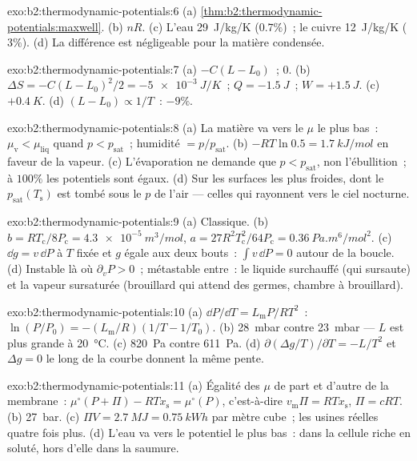 \begin{solution}{exo:b2:thermodynamic-potentials:6}
(a) \cref{thm:b2:thermodynamic-potentials:maxwell}. (b) $nR$. (c) L'eau
\qty{29}{J/kg/K} ($0.7\%$)~; le cuivre \qty{12}{J/kg/K} ($3\%$). (d) La
différence est négligeable pour la matière condensée.
\end{solution}

\begin{solution}{exo:b2:thermodynamic-potentials:7}
(a) $-C(L - L_0)$~; $0$. (b) $\Delta S = -C(L - L_0)^2/2 = \qty{-5e-3}{J/K}$~; $Q =
\qty{-1.5}{J}$~; $W = +\qty{1.5}{J}$. (c) $+\qty{0.4}{K}$. (d) $(L - L_0) \propto
1/T$~: $-9\%$.
\end{solution}

\begin{solution}{exo:b2:thermodynamic-potentials:8}
(a) La matière va vers le $\mu$ le plus bas~: $\mu_{\text{v}} < \mu_{\text{liq}}$ quand $p <
p_{\text{sat}}$~; humidité $= p/p_{\text{sat}}$. (b) $-RT\ln 0.5 = \qty{1.7}{kJ/mol}$
en faveur de la vapeur. (c) L'évaporation ne demande que $p < p_{\text{sat}}$,
non l'ébullition~; à $100\%$ les potentiels sont égaux. (d) Sur les surfaces les plus
froides, dont le $p_{\text{sat}}(T_{\text{s}})$ est tombé sous le $p$ de l'air
--- celles qui rayonnent vers le ciel nocturne.
\end{solution}

\begin{solution}{exo:b2:thermodynamic-potentials:9}
(a) Classique. (b) $b = RT_{\text{c}}/8P_{\text{c}} = \qty{4.3e-5}{m^3/mol}$, $a =
27R^2T_{\text{c}}^2/64P_{\text{c}} = \qty{0.36}{Pa.m^6/mol^2}$. (c) $\dd g = v\,\dd P$
à $T$ fixée et $g$ égale aux deux bouts~: $\int v\,\dd P = 0$ autour de la
boucle. (d) Instable là où $\partial_vP > 0$~; métastable entre~: le
liquide surchauffé (qui sursaute) et la vapeur sursaturée (brouillard qui
attend des germes, chambre à brouillard).
\end{solution}

\begin{solution}{exo:b2:thermodynamic-potentials:10}
(a) $\dd P/\dd T = L_{\text{m}}P/RT^2$~: $\ln(P/P_0) = -(L_{\text{m}}/R)(1/T - 1/T_0)$.
(b) \qty{28}{mbar} contre \qty{23}{mbar} --- $L$ est plus grande à \qty{20}{\celsius}.
(c) \qty{820}{Pa} contre \qty{611}{Pa}. (d) $\partial(\Delta g/T)/\partial T = -L/T^2$
et $\Delta g = 0$ le long de la courbe donnent la même pente.
\end{solution}

\begin{solution}{exo:b2:thermodynamic-potentials:11}
(a) Égalité des $\mu$ de part et d'autre de la membrane~: $\mu^\circ(P + \Pi) - RTx_{\text{s}} =
\mu^\circ(P)$, c'est-à-dire $v_{\text{m}}\Pi = RTx_{\text{s}}$, $\Pi = cRT$. (b) \qty{27}{bar}.
(c) $\Pi V = \qty{2.7}{MJ} = \qty{0.75}{kWh}$ par mètre cube~; les usines réelles
quatre fois plus. (d) L'eau va vers le potentiel le plus bas~: dans la
cellule riche en soluté, hors d'elle dans la saumure.
\end{solution}

